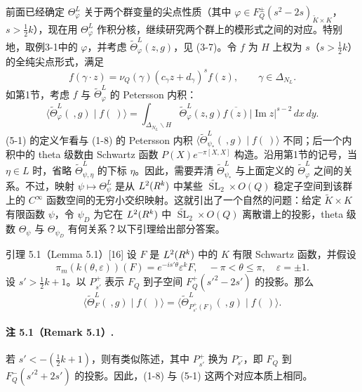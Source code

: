 前面已经确定 $\Theta_\varphi^L$ 关于两个群变量的尖点性质（其中 $\varphi\in F_Q^\pm(s^2-2s)_{\widetilde K\times K}$，$s>\tfrac12k$），现在用 $\Theta_\varphi^L$ 作积分核，继续研究两个群上的模形式之间的对应。特别地，取例3-1中的 $\varphi$，并考虑 $\widetilde\Theta_\varphi^L(z,g)$，见 (3-7)。令 $f$ 为 $H$ 上权为 $s$（$s>\tfrac12k$）的全纯尖点形式，满足
\[
 f(\gamma\cdot z)=\nu_Q(\gamma)(c_\gamma z+d_\gamma)^s f(z),\qquad\gamma\in\Delta_{N_L}.
\]
如第1节，考虑 $f$ 与 $\widetilde\Theta_\varphi^L$ 的 Petersson 内积：
\begin{equation}
 \langle\widetilde\Theta_\varphi^L(\ ,g)\mid f(\ )\rangle
 =\int_{\Delta_{N_L}\backslash H}\widetilde\Theta_\varphi^L(z,g)
 \overline{f(z)}|\operatorname{Im}z|^{s-2}\,dx\,dy.\tag{5-1}
\end{equation}
(5-1) 的定义乍看与 (1-8) 的 Petersson 内积
$\langle\widetilde\Theta_{\psi_*}^L(\ ,g)\mid f(\ )\rangle$ 不同；后一个内积中的 theta 级数由 Schwartz 函数 $P(X)e^{-\pi[X,X]}$ 构造。沿用第1节的记号，当 $\eta\in L$ 时，省略 $\widetilde\Theta_{\psi,\eta}^L$ 的下标 $\eta$。因此，需要弄清 $\widetilde\Theta_{\psi_*}^L$ 与上面定义的 $\widetilde\Theta_\varphi^L$ 之间的关系。不过，映射 $\psi\mapsto\Theta_\psi^L$ 是从 $L^2(R^k)$ 中某些 $\widetilde{\operatorname{SL}}_2\times O(Q)$ 稳定子空间到该群上的 $C^\infty$ 函数空间的无穷小交织映射。这就引出了一个自然的问题：给定 $\widetilde K\times K$ 有限函数 $\psi$，令 $\psi_D$ 为它在 $L^2(R^k)$ 中 $\widetilde{\operatorname{SL}}_2\times O(Q)$ 离散谱上的投影，theta 级数 $\Theta_\psi$ 与 $\Theta_{\psi_D}$ 有何关系？以下引理给出部分答案。

\begin{originaltheorem}{引理 5.1（Lemma 5.1）[16]}
设 $F$ 是 $L^2(R^k)$ 中的 $K$ 有限 Schwartz 函数，并假设
\[
 \pi_m(k(\theta,\varepsilon))(F)=e^{-is'\theta}\varepsilon^kF,
 \quad-\pi<\theta\le\pi,\quad\varepsilon=\pm1.
\]
设 $s'>\tfrac12k+1$。以 $P_{s'}^+$ 表示 $F_Q$ 到子空间
$F_Q^+(s'^2-2s')$ 的投影。那么
\begin{equation}
 \langle\widetilde\Theta_F^L(\ ,g)\mid f(\ )\rangle
 =\langle\widetilde\Theta_{P_{s'}^+(F)}^L(\ ,g)\mid f(\ )\rangle.\tag{5-2}
\end{equation}
\end{originaltheorem}

\paragraph*{注 5.1（Remark 5.1）.}
若 $s'<-(\tfrac12k+1)$，则有类似陈述，其中 $P_{s'}^+$ 换为 $P_{s'}^-$，即 $F_Q$ 到 $F_Q^-(s'^2+2s')$ 的投影。因此，(1-8) 与 (5-1) 这两个对应本质上相同。

